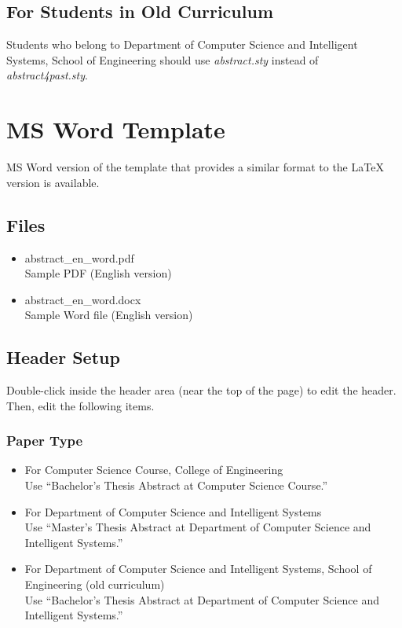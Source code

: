 \documentclass[a4paper,twoside,twocolumn,10pt]{article}
\begin{document}
\subsection{For Students in Old Curriculum}
Students who belong to Department of Computer Science and Intelligent Systems,
School of Engineering should use
\textit{abstract.sty} instead of \textit{abstract4past.sty}.

\section{MS Word Template}
MS Word version of the template that provides a similar format to the LaTeX version is available.

\subsection{Files}
\begin{itemize}
\item abstract\_en\_word.pdf\\
  Sample PDF (English version)
\item abstract\_en\_word.docx\\
  Sample Word file (English version)
\end{itemize}

\subsection{Header Setup}
Double-click inside the header area (near the top of the page) to edit the header.
Then, edit the following items.

\subsubsection{Paper Type}
\begin{itemize}
\item For Computer Science Course, College of Engineering\\
Use ``Bachelor's Thesis Abstract at Computer Science Course.''
\item For Department of Computer Science and Intelligent Systems\\
Use ``Master's Thesis Abstract at Department of Computer Science and Intelligent Systems.''
\item For Department of Computer Science and Intelligent Systems,
School of Engineering (old curriculum)\\
Use ``Bachelor's Thesis Abstract at Department of Computer Science and Intelligent Systems.''
\end{itemize}
\end{document}
